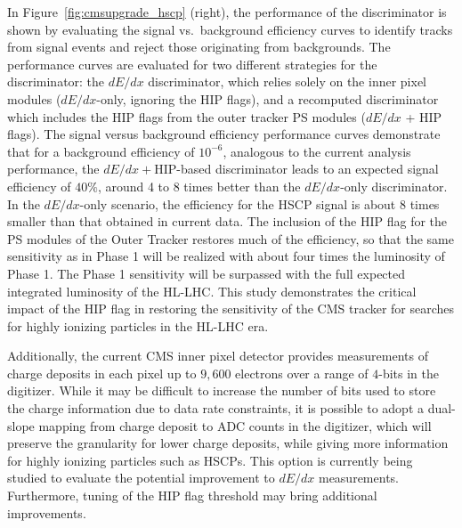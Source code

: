 In Figure~\ref{fig:cmsupgrade_hscp} (right), the performance of the discriminator is shown by evaluating the signal vs.~background efficiency curves to identify tracks from signal events and reject those originating from backgrounds. The performance curves are evaluated for two different strategies for the discriminator: the $dE/dx$ discriminator, which relies solely on the inner pixel modules ($dE/dx$-only, ignoring the HIP flags), and a recomputed discriminator which includes the HIP flags from the outer tracker PS modules ($dE/dx$ + HIP flags). The signal versus background efficiency performance curves demonstrate that for a background efficiency of $10^{-6}$, analogous to the current analysis performance, the $dE/dx+$HIP-based discriminator leads to an expected signal efficiency of $40\%$, around 4 to 8 times better than the $dE/dx$-only discriminator. In the $dE/dx$-only scenario, the efficiency for the HSCP signal is about 8 times smaller than that obtained in current data. The inclusion of the HIP flag for the PS modules of the Outer Tracker restores much of the efficiency, so that the same sensitivity as in Phase 1 will be realized with about four times the luminosity of Phase 1. The Phase 1 sensitivity will be surpassed with the full expected integrated luminosity of the HL-LHC. This study demonstrates the critical impact of the HIP flag in restoring the sensitivity of the CMS tracker for searches for highly ionizing particles in the HL-LHC era.

Additionally, the current CMS inner pixel detector provides measurements of charge deposits in each pixel up to $9,600$ electrons over a range of $4$-bits in the digitizer. While it may be difficult to increase the number of bits used to store the charge information due to data rate constraints, it is possible to adopt a dual-slope mapping from charge deposit to ADC counts in the digitizer, which will preserve the granularity for lower charge deposits, while giving more information for highly ionizing particles such as HSCPs. This option is currently being studied to evaluate the potential improvement to $dE/dx$ measurements. Furthermore, tuning of the HIP flag threshold may bring additional improvements.

